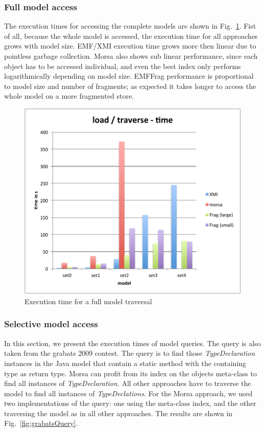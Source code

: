 \subsubsection*{Full model access}

The execution times for accessing the complete models are shown in Fig.~\ref{fig:grabatsLoadTraverse}. Fist of all,  because the whole model is accessed, the execution time for all approaches grows with model size. EMF/XMI execution time grows more then linear due to pointless garbage collection. Morsa also shows sub linear performance, since each object has to be accessed individual, and even the best index only performs logarithmically depending on model size. EMFFrag performance is proportional to model size and number of fragments; as expected it takes longer to access the whole model on a more fragmented store.

\begin{figure}
  \centering
  \includegraphics[width=0.65\linewidth]{figures/grabatsLoadTraverse}
  \caption{Execution time for a full model traversal}
  \label{fig:grabatsLoadTraverse}
\end{figure}

\subsubsection*{Selective model access}

In this section, we present the execution times of model queries. The query is also taken from the grabats 2009 contest. The query is to find those \emph{TypeDeclaration} instances in the Java model that contain a static method with the containing type as return type. Morsa can profit from its index on the objects meta-class to find all instances of \emph{TypeDeclaration}. All other approaches have to traverse the model to find all instances of \emph{TypeDeclations}. For the Morsa approach, we used two implementations of the query: one using the meta-class index, and the other traversing the model as in all other approaches. The results are shown in Fig.~\ref{fig:grabatsQuery}.

